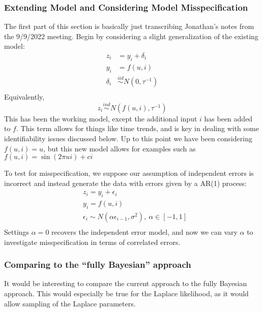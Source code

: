 \documentclass[12pt]{article}
\begin{document}
\subsubsection{Extending Model and Considering Model Misspecification}
The first part of this section is basically just transcribing Jonathan's notes from the 9/9/2022 meeting. Begin by considering a slight generalization of the existing model: 
\begin{align*}
z_i &= y_i + \delta_i \\
y_i &= f(u, i) \\
\delta_i &\overset{iid}{\sim} N(0, \tau^{-1}) \\
\end{align*}
Equivalently, 
\[z_i \overset{ind}{\sim} N(f(u, i), \tau^{-1})\]
This has been the working model, except the additional input $i$ has been added to $f$. This term allows for things like time trends, and is key in dealing with some 
identifiability issues discussed below. Up to this point we have been considering $f(u, i) = u$, but this new model allows for examples such as
$f(u, i) = \sin(2\pi u i) + ci$

To test for misspecification, we suppose our assumption of independent errors is incorrect and instead generate the data with errors given by a AR(1) process:
\begin{align*}
&z_i = y_i + \epsilon_i \\
&y_i = f(u, i) \\
&\epsilon_i \sim N(\alpha \epsilon_{i - 1}, \sigma^2), \ \alpha \in [-1, 1] \\
\end{align*}
Settings $\alpha = 0$ recovers the independent error model, and now we can vary $\alpha$ to investigate misspecification in terms of correlated errors. 


\subsubsection{Comparing to the ``fully Bayesian'' approach}
It would be interesting to compare the current approach to the fully Bayesian approach. This would especially be true for the Laplace likelihood, as it would allow sampling of 
the Laplace parameters. 
\end{document}
